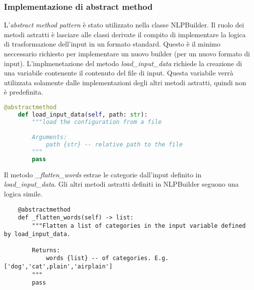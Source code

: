 \subsubsection*{Implementazione di abstract method}
L'\textit{abstract method pattern} è stato utilizzato nella classe NLPBuilder. Il ruolo dei metodi astratti è lasciare alle classi derivate il compito di implementare la logica di trasformazione dell'input in un formato standard. Questo è il minimo neccessario richiesto per implementare un nuovo builder (per un nuovo formato di input).
\newline\newline
L'implmenetazione del metodo \textit{load\_input\_data} richiede la creazione di una variabile contenente il contenuto del file di input. Questa variabile verrà utilizzata solamente dalle implementazioni degli altri metodi astratti, quindi non è predefinita.
\begin{lstlisting}[language=python]
    @abstractmethod
    def load_input_data(self, path: str):
        """load the configuration from a file

        Arguments:
            path {str} -- relative path to the file
        """
        pass
\end{lstlisting}
Il metodo \textit{\_flatten\_words} estrae le categorie dall'input definito in \textit{load\_input\_data}. Gli altri metodi astratti definiti in NLPBuilder seguono una logica simile.
\begin{lstlisting}
    @abstractmethod
    def _flatten_words(self) -> list:
        """Flatten a list of categories in the input variable defined by load_input_data.

        Returns:
            words {list} -- of categories. E.g. ['dog','cat',plain','airplain']
        """
        pass
\end{lstlisting}